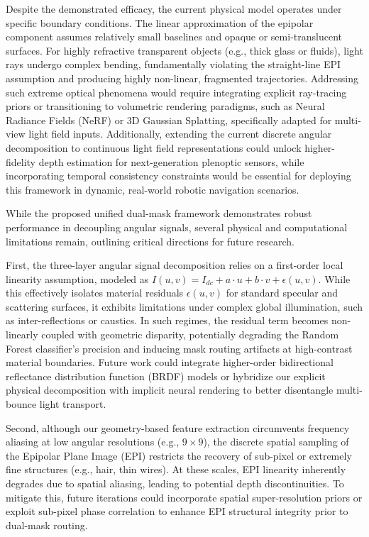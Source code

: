 \documentclass[lettersize,journal]{IEEEtran}
\begin{document}
Despite the demonstrated efficacy, the current physical model operates under specific boundary conditions. The linear approximation of the epipolar component assumes relatively small baselines and opaque or semi-translucent surfaces. For highly refractive transparent objects (e.g., thick glass or fluids), light rays undergo complex bending, fundamentally violating the straight-line EPI assumption and producing highly non-linear, fragmented trajectories. Addressing such extreme optical phenomena would require integrating explicit ray-tracing priors or transitioning to volumetric rendering paradigms, such as Neural Radiance Fields (NeRF) or 3D Gaussian Splatting, specifically adapted for multi-view light field inputs. Additionally, extending the current discrete angular decomposition to continuous light field representations could unlock higher-fidelity depth estimation for next-generation plenoptic sensors, while incorporating temporal consistency constraints would be essential for deploying this framework in dynamic, real-world robotic navigation scenarios.

While the proposed unified dual-mask framework demonstrates robust performance in decoupling angular signals, several physical and computational limitations remain, outlining critical directions for future research.

First, the three-layer angular signal decomposition relies on a first-order local linearity assumption, modeled as $I(u,v) = I_{dc} + a \cdot u + b \cdot v + \epsilon(u,v)$. While this effectively isolates material residuals $\epsilon(u,v)$ for standard specular and scattering surfaces, it exhibits limitations under complex global illumination, such as inter-reflections or caustics. In such regimes, the residual term becomes non-linearly coupled with geometric disparity, potentially degrading the Random Forest classifier's precision and inducing mask routing artifacts at high-contrast material boundaries. Future work could integrate higher-order bidirectional reflectance distribution function (BRDF) models or hybridize our explicit physical decomposition with implicit neural rendering to better disentangle multi-bounce light transport.

Second, although our geometry-based feature extraction circumvents frequency aliasing at low angular resolutions (e.g., $9 \times 9$), the discrete spatial sampling of the Epipolar Plane Image (EPI) restricts the recovery of sub-pixel or extremely fine structures (e.g., hair, thin wires). At these scales, EPI linearity inherently degrades due to spatial aliasing, leading to potential depth discontinuities. To mitigate this, future iterations could incorporate spatial super-resolution priors or exploit sub-pixel phase correlation to enhance EPI structural integrity prior to dual-mask routing.
\end{document}

